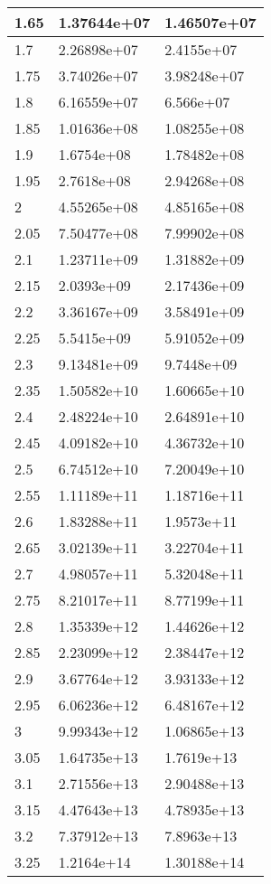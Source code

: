 \documentclass[a4paper,14pt]{extarticle}
\begin{document}
\begin{longtable}{|m{3cm}|m{3cm}|m{3cm}|}
1.65 & 1.37644e+07 & 1.46507e+07\\
\hline
1.7 & 2.26898e+07 & 2.4155e+07\\
\hline
1.75 & 3.74026e+07 & 3.98248e+07\\
\hline
1.8 & 6.16559e+07 & 6.566e+07\\
\hline
1.85 & 1.01636e+08 & 1.08255e+08\\
\hline
1.9 & 1.6754e+08 & 1.78482e+08\\
\hline
1.95 & 2.7618e+08 & 2.94268e+08\\
\hline
2 & 4.55265e+08 & 4.85165e+08\\
\hline
2.05 & 7.50477e+08 & 7.99902e+08\\
\hline
2.1 & 1.23711e+09 & 1.31882e+09\\
\hline
2.15 & 2.0393e+09 & 2.17436e+09\\
\hline
2.2 & 3.36167e+09 & 3.58491e+09\\
\hline
2.25 & 5.5415e+09 & 5.91052e+09\\
\hline
2.3 & 9.13481e+09 & 9.7448e+09\\
\hline
2.35 & 1.50582e+10 & 1.60665e+10\\
\hline
2.4 & 2.48224e+10 & 2.64891e+10\\
\hline
2.45 & 4.09182e+10 & 4.36732e+10\\
\hline
2.5 & 6.74512e+10 & 7.20049e+10\\
\hline
2.55 & 1.11189e+11 & 1.18716e+11\\
\hline
2.6 & 1.83288e+11 & 1.9573e+11\\
\hline
2.65 & 3.02139e+11 & 3.22704e+11\\
\hline
2.7 & 4.98057e+11 & 5.32048e+11\\
\hline
2.75 & 8.21017e+11 & 8.77199e+11\\
\hline
2.8 & 1.35339e+12 & 1.44626e+12\\
\hline
2.85 & 2.23099e+12 & 2.38447e+12\\
\hline
2.9 & 3.67764e+12 & 3.93133e+12\\
\hline
2.95 & 6.06236e+12 & 6.48167e+12\\
\hline
3 & 9.99343e+12 & 1.06865e+13\\
\hline
3.05 & 1.64735e+13 & 1.7619e+13\\
\hline
3.1 & 2.71556e+13 & 2.90488e+13\\
\hline
3.15 & 4.47643e+13 & 4.78935e+13\\
\hline
3.2 & 7.37912e+13 & 7.8963e+13\\
\hline
3.25 & 1.2164e+14 & 1.30188e+14\\

\end{longtable}
\end{document}
